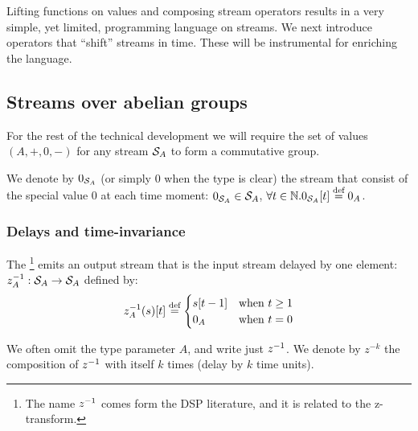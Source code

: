 

Lifting functions on values and composing stream operators results in a very simple, yet limited, programming language on streams.
We next introduce operators that ``shift'' streams in time.
These will be instrumental for enriching the language.

\subsection{Streams over abelian groups}\label{sec:abelian}

For the rest of the technical development we will require the set of values $(A, +, 0, -)$
for any stream $\mathcal{S}_{A}$ to form a commutative group.

We denote by $0_{\mathcal{S}_{A}}$ (or simply $0$ when the type is clear) the stream that consist of the special
value 0 at each time moment: $0_{\mathcal{S}_{A}} \in \mathcal{S}_{A}$, $\forall t \in \mathbb{N} . 0_{\mathcal{S}_{A}}[t] \stackrel{\textrm{\scriptsize def}}{=} 0_A$.

\subsubsection{Delays and time-invariance}\label{sec:delay}

\begin{definition}[Delay]
The \footnote{The name $z^{-1}$
comes form the DSP literature, and it is related to the z-transform.} emits an output stream that is
the input stream delayed by one element: $z^{-1}_A: \mathcal{S}_{A} \to \mathcal{S}_{A}$ defined by:
$$
z^{-1}_A(s)[t] \stackrel{\textrm{\scriptsize def}}{=}  \begin{cases}
s[t - 1] & \text{when}~t\geq1\\
0_A      & \text{when}~t=0
\end{cases}
$$

We often omit the type parameter $A$, and write just $z^{-1}$.
We denote by $z^{-k}$ the composition of $z^{-1}$
with itself $k$ times (delay by $k$ time units).
\end{definition}

\begin{center}
\end{center}

